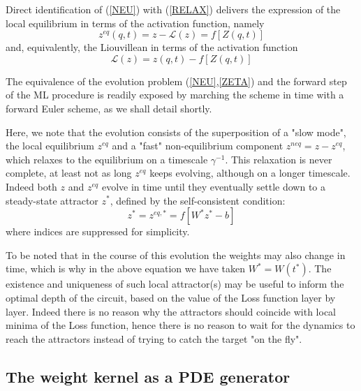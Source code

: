 \documentclass[15pt]{article}
\begin{document}
Direct identification of (\ref{NEU}) with (\ref{RELAX}) delivers 
the expression of the local equilibrium in terms of the activation 
function, namely 
\begin{equation}
\label{EQ1}
z^{eq}(q,t) = z - \mathcal{L}(z) = f[Z(q,t)]
\end{equation}
and, equivalently, the Liouvillean in terms of the activation function
\begin{equation}
\label{EQ2}
\mathcal{L}(z) = z(q,t)- f[Z(q,t)]
\end{equation}

The equivalence of the evolution problem (\ref{NEU},\ref{ZETA}) and the
forward step of the ML procedure is readily exposed by marching
the scheme in time with a forward Euler scheme, as we shall detail shortly.

Here, we note that the evolution consists of the superposition of a 
"slow mode", the local equilibrium $z^{eq}$ 
and a "fast" non-equilibrium component $z^{neq} = z-z^{eq}$,
which relaxes to the equilibrium on a timescale $\gamma^{-1}$.
This relaxation is never complete, at least not 
as long $z^{eq}$ keeps evolving, although on a longer timescale.
Indeed both $z$ and $z^{eq}$ evolve in time until they eventually 
settle down to a steady-state attractor $z^*$, defined by the 
self-consistent condition:
\begin{equation}
z^* = z^{eq,*} = f[W^*z^*-b]
\end{equation}
where indices are suppressed for simplicity.

To be noted that in the course of this evolution the weights 
may also change in time, which is why in the above equation we have
taken $W^* = W(t^*)$.   
The existence and uniqueness of such local attractor(s) may
be useful to inform the optimal depth of the circuit, based on the
value of the Loss function layer by layer. 
Indeed there is no reason why the attractors should coincide
with local minima of the Loss function, hence there is no reason
to wait for the dynamics to reach the attractors instead of trying
to catch the target "on the fly".

\subsection{The weight kernel as a PDE generator}
\end{document}
